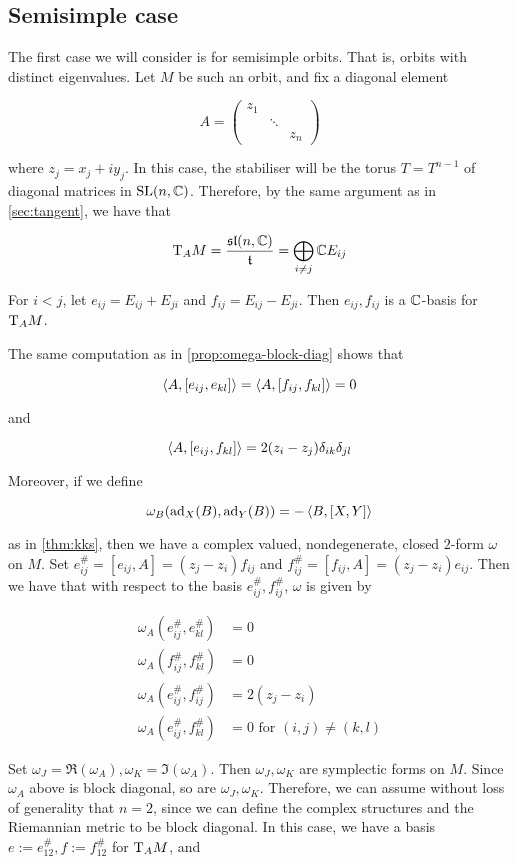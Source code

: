 \documentclass{article}
\renewcommand{\sl}{\mathfrak{sl}}
\begin{document}
\subsection{Semisimple case}

The first case we will consider is for semisimple orbits. That is, orbits with distinct eigenvalues. Let \(M\) be such an orbit, and fix a diagonal element

\[A = \begin{pmatrix}
    z_1 \\
    & \ddots \\
    & & z_n
\end{pmatrix}\]

where \(z_j = x_j + iy_j\). In this case, the stabiliser will be the torus \(T = T^{n-1}\) of diagonal matrices in \(\operatorname{SL}(n, \mathbb{C})\). Therefore, by the same argument as in \cref{sec:tangent}, we have that

\[\T_AM = \frac{\sl(n, \C)}{\mft} = \bigoplus_{i \ne j}\C E_{ij}\]

For \(i < j\), let \(e_{ij} = E_{ij} + E_{ji}\) and \(f_{ij} = E_{ij} - E_{ji}\). Then \(e_{ij}, f_{ij}\) is a \(\mathbb{C}\)-basis for \(\mathrm{T}_A M\).

The same computation as in \cref{prop:omega-block-diag} shows that

\[\left\langle A, [e_{ij}, e_{kl}] \right\rangle = \left\langle A, [f_{ij}, f_{kl}] \right\rangle = 0\]

and

\[\left\langle A, [e_{ij}, f_{kl}] \right\rangle = 2(z_i - z_j)\delta_{ik}\delta_{jl}\]

Moreover, if we define

\[\omega_B(\operatorname{ad}_X(B), \operatorname{ad}_Y(B)) = -\left\langle B, [X, Y] \right\rangle\]

as in \cref{thm:kks}, then we have a complex valued, nondegenerate, closed \(2\)-form \(\omega\) on \(M\). Set \(e_{ij}^\# = [e_{ij}, A] = (z_j - z_i)f_{ij}\) and \(f_{ij}^\# = [f_{ij}, A] = (z_j - z_i)e_{ij}\). Then we have that with respect to the basis \(e_{ij}^\#, f_{ij}^\#\), \(\omega\) is given by

\begin{align*}
    \omega_A(e_{ij}^\#, e_{kl}^\#) &= 0 \\
    \omega_A(f_{ij}^\#, f_{kl}^\#) &= 0 \\
    \omega_A(e_{ij}^\#, f_{ij}^\#) &= 2(z_j - z_i) \\
    \omega_A(e_{ij}^\#, f_{kl}^\#) &= 0 \text{ for }(i, j) \ne (k, l)
\end{align*}

Set \(\omega_J = \Re(\omega_A), \omega_K = \Im(\omega_A)\). Then \(\omega_J, \omega_K\) are symplectic forms on \(M\). Since \(\omega_A\) above is block diagonal, so are \(\omega_J, \omega_K\). Therefore, we can assume without loss of generality that \(n = 2\), since we can define the complex structures and the Riemannian metric to be block diagonal. In this case, we have a basis \(e := e_{12}^\#, f := f_{12}^\#\) for \(\mathrm{T}_AM\), and
\end{document}
